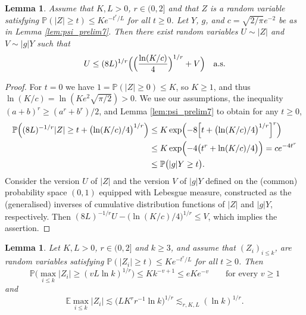 \documentclass[a4paper]{amsart}
\newtheorem{lemma}[theorem]{Lemma}
\theoremstyle{definition}
\theoremstyle{remark}
\numberwithin{equation}{section}
\newcommand*{\EE}{\mathbb{E}}
\newcommand*{\PP}{\mathbb{P}}
\begin{document}
\begin{lemma} \label{lem:coupling}
	Assume that $K, L>0$, $r\in(0,2]$ 
	and that $Z$ is a  random variable satisfying $\PP(|Z|\ge t) \le Ke^{-t^r/L}$ for all $t\ge 0$.
	Let $Y$, $g$, and $c=\sqrt{2/\pi}e^{-2}$ be as in Lemma \ref{lem:psi_prelim7}.
	Then there exist random variables $U\sim |Z|$ and $V\sim |g|Y$ such that
	\begin{equation*}
		U\le  (8L)^{1/r}\Bigl(\Bigl(\frac{\ln(K/c)}4\Bigr)^{1/r} +V \Bigr) \quad \text{a.s.}
	\end{equation*}
\end{lemma}

\begin{proof}
For $t=0$ we have $1=\PP(|Z|\ge 0)\le K$, so $K\ge 1$, and thus $\ln(K/c)=\ln(Ke^2\sqrt{\pi/2})>0$.
We use our assumptions, the inequality $(a+b)^r\ge (a^r+b^r)/2$, and Lemma \ref{lem:psi_prelim7} to obtain for any $t\ge 0$,
	\begin{align*}
		\PP\Bigl((8L)^{-1/r}|Z| \ge t+ \bigl(\ln(K/c)/4\bigr)^{1/r} \Bigr)
		& \le K\exp\Bigl(-8\Bigl[t+ \bigl(\ln(K/c)/4\bigr)^{1/r}\Bigr]^r\Bigr)
		\\ &
		\le K \exp\Bigl(-4\bigl(t^r+ \ln(K/c)/4\bigr)\Bigr) = ce^{-4t^r}
		\\ &
		\le \PP\bigl(|g|Y\ge t\bigr).
	\end{align*}
Consider the version $U$ of $|Z|$ and the version $V$ of $|g|Y$  defined on the (common) probability space $(0, 1)$ equipped with Lebesgue measure,
constructed as the (generalised) inverses of cumulative distribution functions of $|Z|$ and $|g|Y$, respectively.
Then
$(8L)^{-1/r} U - \bigl(\ln(K/c)/4\bigr)^{1/r} \le V $, which implies the assertion.
\end{proof}


\begin{lemma} 	
	\label{lem:max-psi-r}
	Let $K,L>0$, $r\in (0,2]$ and  $k\ge 3$,
	and assume that  $(Z_i)_{i\le k}$, are  random variables satisfying $\PP(|Z_i|\ge t) \le Ke^{-t^r/L}$ for all $t\ge 0$. Then
	\[
		\PP\bigl(\max_{i\le k} |Z_i|\ge (vL \ln k)^{1/r}\bigr)\leq K k^{-v+1} \leq eKe^{-v} \qquad \text{for every }v\ge 1
	\]
	and
	\[
		\EE\max_{i\le k} |Z_i|  \lesssim \bigl( LK^r r^{-1} \ln k \bigr)^{1/r} \lesssim_{r,K,L} (\ln k)^{1/r}.
	\]
\end{lemma}
\end{document}

